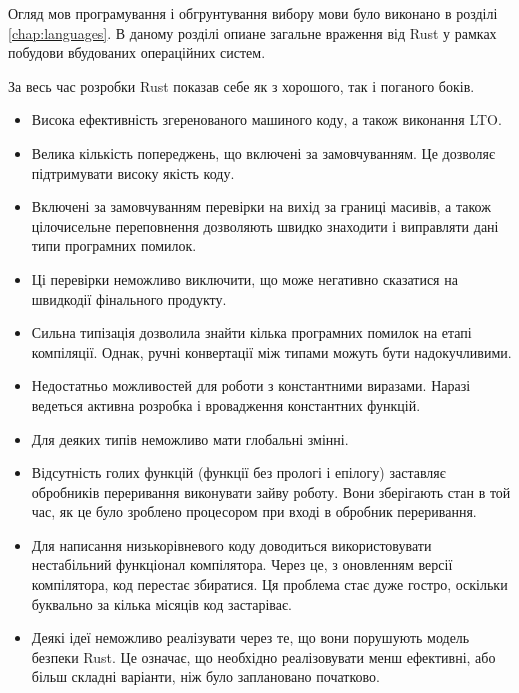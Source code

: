 \documentclass[main.tex]{subfiles}
\begin{document}
Огляд мов програмування і обгрунтування вибору мови було виконано в розділі \ref{chap:languages}. В даному розділі опиане загальне враження від Rust у рамках побудови вбудованих операційних систем.

За весь час розробки Rust показав себе як з хорошого, так і поганого боків.

\begin{itemize}
\item Висока ефективність згеренованого машиного коду, а також виконання \ac{LTO}.

\item Велика кількість попереджень, що включені за замовчуванням. Це дозволяє підтримувати високу якість коду.

\item Включені за замовчуванням перевірки на вихід за границі масивів, а також цілочисельне переповнення дозволяють швидко знаходити і виправляти дані типи програмних помилок.

\item Ці перевірки неможливо виключити, що може негативно сказатися на швидкодії фінального продукту.

\item Сильна типізація дозволила знайти кілька програмних помилок на етапі компіляції. Однак, ручні конвертації між типами можуть бути надокучливими.

\item Недостатньо можливостей для роботи з константними виразами. Наразі ведеться активна розробка і вровадження константних функцій.

\item Для деяких типів неможливо мати глобальні змінні.

\item Відсутність голих функцій (функції без прологі і епілогу) заставляє обробників переривання виконувати зайву роботу. Вони зберігають стан в той час, як це було зроблено процесором при вході в обробник переривання.

\item Для написання низькорівневого коду доводиться використовувати нестабільний функціонал компілятора. Через це, з оновленням версії компілятора, код перестає збиратися. Ця проблема стає дуже гостро, оскільки буквально за кілька місяців код застаріває.

\item Деякі ідеї неможливо реалізувати через те, що вони порушують модель безпеки Rust. Це означає, що необхідно реалізовувати менш ефективні, або більш складні варіанти, ніж було заплановано початково.
\end{itemize}
\end{document}
